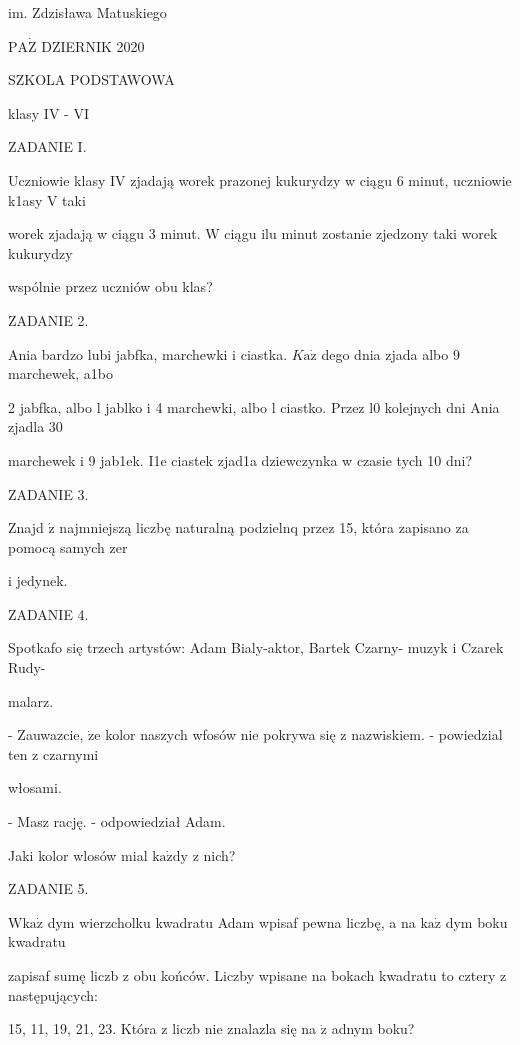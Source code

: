 \documentclass[a4paper,12pt]{article}
\begin{document}
im. Zdzisława Matuskiego

$\mathrm{P}\mathrm{A}\dot{\mathrm{Z}}$ DZIERNIK 2020

SZKOLA PODSTAWOWA

klasy IV - VI

ZADANIE I.

Uczniowie klasy IV zjadają worek prazonej kukurydzy w ciągu 6 minut, uczniowie k1asy V taki

worek zjadają w ciągu 3 minut. $\mathrm{W}$ ciągu ilu minut zostanie zjedzony taki worek kukurydzy

wspólnie przez uczniów obu klas?

ZADANIE 2.

Ania bardzo lubi jabfka, marchewki i ciastka. $K\mathrm{a}\dot{\mathrm{z}}$ dego dnia zjada albo 9 marchewek, a1bo

2 jabfka, albo l jablko i 4 marchewki, albo l ciastko. Przez l0 kolejnych dni Ania zjadla 30

marchewek i 9 jab1ek. I1e ciastek zjad1a dziewczynka w czasie tych 10 dni?

ZADANIE 3.

Znajd $\acute{\mathrm{z}}$ najmniejszą liczbę naturalną podzielnq przez 15, która zapisano za pomocą samych zer

i jedynek.

ZADANIE 4.

Spotkafo się trzech artystów: Adam Bialy-aktor, Bartek Czarny- muzyk i Czarek Rudy-

malarz.

- Zauwazcie, $\dot{\mathrm{z}}\mathrm{e}$ kolor naszych wfosów nie pokrywa się z nazwiskiem. - powiedzial ten z czarnymi

włosami.

- Masz rację. - odpowiedział Adam.

Jaki kolor wlosów mial $\mathrm{k}\mathrm{a}\dot{\mathrm{z}}\mathrm{d}\mathrm{y}$ z nich?

ZADANIE 5.

$\mathrm{W} \mathrm{k}\mathrm{a}\dot{\mathrm{z}}$ dym wierzcholku kwadratu Adam wpisaf pewna liczbę, a na $\mathrm{k}\mathrm{a}\dot{\mathrm{z}}$ dym boku kwadratu

zapisaf sumę liczb z obu końców. Liczby wpisane na bokach kwadratu to cztery z następujących:

15, 11, 19, 21, 23. Która z liczb nie znalazla się na $\dot{\mathrm{z}}$ adnym boku?
\end{document}
